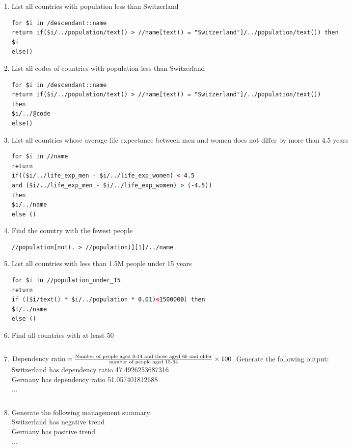 \begin{enumerate}
\item List all countries with population less than Switzerland
\begin{lstlisting}[language=XML]
for $i in /descendant::name
return if($i/../population/text() > //name[text() = "Switzerland"]/../population/text()) then
$i
else()
\end{lstlisting}

\item List all codes of countries with population less than Switzerland
\begin{lstlisting}[language=XML]
for $i in /descendant::name
return if($i/../population/text() > //name[text() = "Switzerland"]/../population/text()) 
then
$i/../@code
else()
\end{lstlisting}

\item List all countries whose average life expectance between men and women does not differ by more than 4.5 years
\begin{lstlisting}[language=XML]
for $i in //name 
return
if(($i/../life_exp_men - $i/../life_exp_women) < 4.5
and ($i/../life_exp_men - $i/../life_exp_women) > (-4.5))
then 
$i/../name
else ()
\end{lstlisting}

\item Find the country with the fewest people
\begin{lstlisting}[language=XML]
//population[not(. > //population)][1]/../name
\end{lstlisting}

\item List all countries with less than 1.5M people under 15 years
\begin{lstlisting}[language=XML]
for $i in //population_under_15
return 
if (($i/text() * $i/../population * 0.01)<1500000) then
$i/../name
else ()
\end{lstlisting}

\item Find all countries with at least 50%
\begin{lstlisting}[language=XML]
\end{lstlisting}

\item $\textnormal{Dependency ratio}=\frac{\textnormal{Number of people aged 0-14 and those aged 65 and older}}{\textnormal{number of people aged 15-64}}\times 100$. Generate the following output:\\
Switzerland has dependency ratio 47.4926253687316 \\
Germany has dependency ratio 51.057401812688\\...
\begin{lstlisting}[language=XML]
\end{lstlisting}

\item Generate the following management summary:\\
Switzerland has negative trend\\
Germany has positive trend\\...
\begin{lstlisting}[language=XML]
\end{lstlisting}
\end{enumerate}